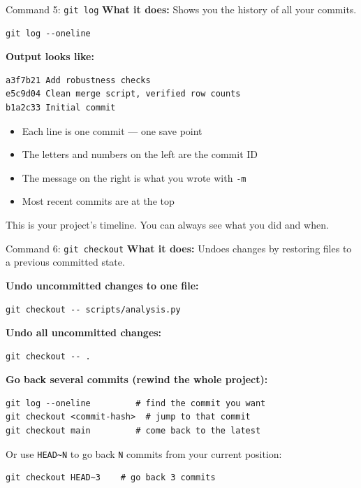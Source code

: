 \documentclass[aspectratio=169, 11pt]{beamer}
\begin{document}
\begin{frame}[fragile]{Command 5: \texttt{git log}}
  \textbf{What it does:} Shows you the history of all your commits.

  \vspace{0.5em}
  \begin{lstlisting}
git log --oneline
  \end{lstlisting}

  \vspace{0.5em}
  \textbf{Output looks like:}
  \begin{lstlisting}
a3f7b21 Add robustness checks
e5c9d04 Clean merge script, verified row counts
b1a2c33 Initial commit
  \end{lstlisting}

  \vspace{0.5em}
  \begin{itemize}
    \item Each line is one commit --- one save point
    \item The letters and numbers on the left are the commit ID
    \item The message on the right is what you wrote with \texttt{-m}
    \item Most recent commits are at the top
  \end{itemize}

  \vspace{0.3em}
  This is your project's timeline. You can always see what you did and when.
\end{frame}

\begin{frame}[fragile]{Command 6: \texttt{git checkout}}
  \textbf{What it does:} Undoes changes by restoring files to a previous committed state.

  \vspace{0.5em}
  \textbf{Undo uncommitted changes to one file:}
  \begin{lstlisting}
git checkout -- scripts/analysis.py
  \end{lstlisting}

  \vspace{0.4em}
  \textbf{Undo all uncommitted changes:}
  \begin{lstlisting}
git checkout -- .
  \end{lstlisting}

  \vspace{0.4em}
  \textbf{Go back several commits (rewind the whole project):}
  \begin{lstlisting}
git log --oneline         # find the commit you want
git checkout <commit-hash>  # jump to that commit
git checkout main         # come back to the latest
  \end{lstlisting}

  \vspace{0.3em}
  Or use \texttt{HEAD\~{}N} to go back \texttt{N} commits from your current position:
  \begin{lstlisting}
git checkout HEAD~3    # go back 3 commits
  \end{lstlisting}
\end{frame}
\end{document}
